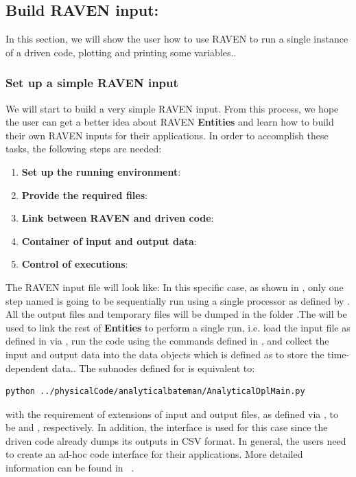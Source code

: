 \subsection{Build RAVEN input: }
In this section, we will show the user how to use RAVEN to run a single instance of a driven code, plotting and
printing some variables.. 
\subsubsection{Set up a simple RAVEN input}
We will start to build a very simple RAVEN input. From this process, we hope the user can get a better idea about
RAVEN \textbf{Entities} and learn how to build their own RAVEN inputs for their applications.
In order to accomplish these tasks, the following steps are needed:
\begin{enumerate}
   \item \textbf{Set up the running environment}: 
   \item \textbf{Provide the required files}: 
   \item \textbf{Link between RAVEN and driven code}: 
   \item \textbf{Container of input and output data}: 
   \item \textbf{Control of executions}: 
\end{enumerate}
The RAVEN input file will look like:
In this specific case, as shown in , only one step named  is going to be
sequentially run using a single processor as defined by . All the output files and temporary
files will be dumped in the folder .The  will be used to
link the rest of \textbf{Entities} to perform a single run, i.e. load the input file  as defined in
 via , run the code using the commands defined in , and collect the
input and output data into the data objects  which is defined as  to store
the time-dependent data..
The subnodes defined for  is equivalent to:
\begin{lstlisting}[language=bash]
python ../physicalCode/analyticalbateman/AnalyticalDplMain.py
\end{lstlisting}
with the requirement of extensions of input and output files, as defined via , to be  and ,
respectively.
In addition, the  interface is used for this case since the driven code already dumps its
outputs in CSV format. In general, the users need to create an ad-hoc code interface for their applications. More
detailed information can be found in ~\cite{RAVENuserManual}. 

